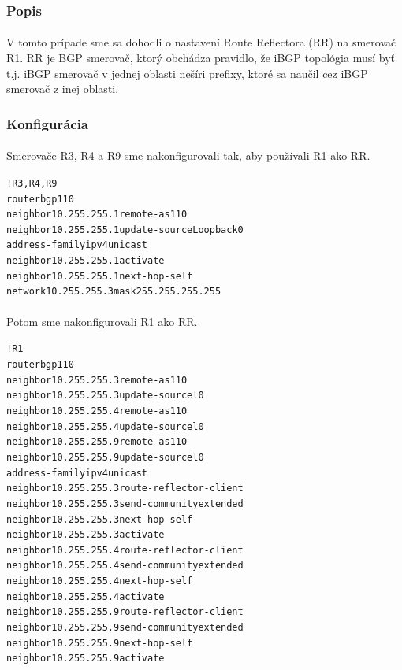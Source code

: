 \documentclass[12pt,twoside,a4paper]{report}
\begin{document}
\subsubsection{Popis}
\paragraph{}
V tomto prípade sme sa dohodli o nastavení Route Reflectora (RR) na smerovač R1. RR je BGP smerovač, ktorý obchádza pravidlo, že iBGP topológia musí byť  t.j. iBGP smerovač v jednej oblasti nešíri prefixy, ktoré sa naučil cez iBGP smerovač z inej oblasti.



\subsubsection{Konfigurácia}
\paragraph{}
Smerovače R3, R4 a R9 sme nakonfigurovali tak, aby používali R1 ako RR.

\noindent
{\selectfont
\begin{small}
\begin{alltt}
!R3, R4, R9
router bgp 110
  neighbor 10.255.255.1 remote-as 110
  neighbor 10.255.255.1 update-source Loopback0
  address-family ipv4 unicast
    neighbor 10.255.255.1 activate
    neighbor 10.255.255.1 next-hop-self
  network 10.255.255.3 mask 255.255.255.255
\end{alltt}
\end{small}
}

\paragraph{}
Potom sme nakonfigurovali R1 ako RR.

\noindent
{\selectfont
\begin{small}
\begin{alltt}
!R1
router bgp 110
  neighbor 10.255.255.3 remote-as 110
  neighbor 10.255.255.3 update-source l0
  neighbor 10.255.255.4 remote-as 110
  neighbor 10.255.255.4 update-source l0
  neighbor 10.255.255.9 remote-as 110
  neighbor 10.255.255.9 update-source l0
  address-family ipv4 unicast
    neighbor 10.255.255.3 route-reflector-client
    neighbor 10.255.255.3 send-community extended
    neighbor 10.255.255.3 next-hop-self
    neighbor 10.255.255.3 activate
    neighbor 10.255.255.4 route-reflector-client
    neighbor 10.255.255.4 send-community extended
    neighbor 10.255.255.4 next-hop-self
    neighbor 10.255.255.4 activate
    neighbor 10.255.255.9 route-reflector-client
    neighbor 10.255.255.9 send-community extended
    neighbor 10.255.255.9 next-hop-self
    neighbor 10.255.255.9 activate 
\end{alltt}
\end{small}
}
\end{document}
